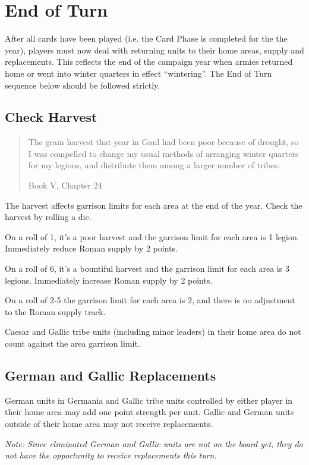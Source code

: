 \section{End of Turn}
\par
After all cards have been played (i.e. the Card Phase is completed for the the year), players must now deal with returning units to their home areas, supply and replacements. This reflects the end of the campaign year when armies returned home or went into winter quarters in effect “wintering”. The End of Turn sequence below should be followed strictly.

\subsection{Check Harvest}
\blockquote[Book V, Chapter 24]{The grain harvest that year in Gaul had been poor because of drought, so I was compelled to change my usual methods of arranging winter quarters for my legions, and distribute them among a larger number of tribes.}
\par
The harvest affects garrison limits for each area at the end of the year. Check the harvest by rolling a die.

On a roll of 1, it’s a poor harvest and the garrison limit for each area is 1 legion. Immediately reduce Roman supply by 2 points.

On a roll of 6, it’s a bountiful harvest and the garrison limit for each area is 3 legions. Immediately increase Roman supply by 2 points.

On a roll of 2-5 the garrison limit for each area is 2, and there is no adjustment to the Roman supply track.

Caesar and Gallic tribe units (including minor leaders) in their home area do not count against the area garrison limit.

\raggedbottom

\subsection{German and Gallic Replacements}
\par
German units in Germania and Gallic tribe units controlled by either player in their home area may add one point strength per unit. Gallic and German units outside of their home area may not receive replacements.

\textit{Note: Since eliminated German and Gallic units are not on the board yet, they do not have the opportunity to receive replacements this turn.}


